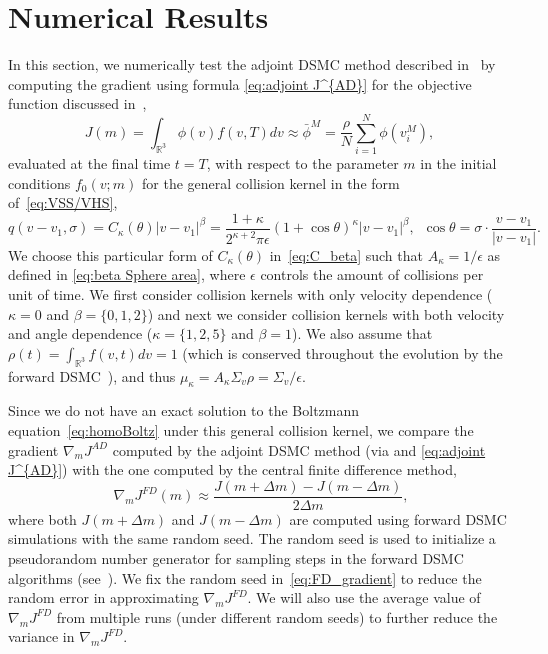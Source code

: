\documentclass[12pt,nopreprintline]{elsarticle}
\newcommand{\bbR}{\mathbb R} \newcommand{\bbS}{\mathbb S}
\begin{document}

\section{Numerical Results}\label{sec:numerics}

In this section, we numerically test the adjoint DSMC method described in~ by computing the gradient using formula \eqref{eq:adjoint J^{AD}} for the objective function discussed in~,
$$
J(m)= \int_{\bbR^3} \phi (v) f(v,T) dv  \approx \bar{\phi}^M = \frac{\rho}{N}\sum_{i=1}^N \phi(v_i^M),
$$
evaluated at the final time $t=T$, with respect to the parameter $m$ in the initial conditions $f_0(v;m)$ for the general collision kernel in the form of~\eqref{eq:VSS/VHS}, 
\begin{equation} \label{eq:C_beta}
q(v-v_1,\sigma) = C_\kappa(\theta) |v-v_1|^\beta =  \frac{1+\kappa}{2^{\kappa+2}\pi \epsilon}  (1+\cos{\theta})^\kappa |v-v_1|^\beta,  \, \,  \, \cos{\theta} = \sigma \cdot \frac{v-v_1}{|v-v_1|} .
\end{equation}
We choose this particular form of $C_\kappa(\theta)$ in~\eqref{eq:C_beta} such that $A_\kappa=1/\epsilon$ as defined in \eqref{eq:beta Sphere area}, where $\epsilon$ controls the amount of collisions per unit of time. 
We first consider collision kernels with only velocity dependence ($\kappa=0$ and $\beta=\{0,1,2\}$) and next we consider collision kernels with both velocity and angle dependence ($\kappa=\{1,2,5\}$ and $\beta=1$).
We also assume that  $\rho(t)=\int_{\bbR^3} f(v,t) dv=1$ (which is conserved throughout the evolution by the forward DSMC~), and thus $\mu_\kappa = A_\kappa \Sigma_v \rho = \Sigma_v/\epsilon$.


Since we do not have an exact solution to the Boltzmann equation~\eqref{eq:homoBoltz} under this general collision kernel, we compare the gradient  $\nabla_m J^{AD}$ computed by the adjoint DSMC method (via  and \cref{eq:adjoint J^{AD}}) with the one computed by the central finite difference method,
\begin{equation}~\label{eq:FD_gradient}
\nabla_m J^{FD}(m) \approx \frac{J(m+\Delta m)-J(m-\Delta m)}{2 \Delta m},
\end{equation}
where both $J(m+\Delta m)$ and $J(m-\Delta m)$ are computed using forward DSMC simulations with the same random seed. The random seed is used to initialize a pseudorandom number generator for sampling steps in the forward DSMC algorithms (see~). We fix the random seed in~\eqref{eq:FD_gradient} to reduce the random error in approximating $\nabla_m J^{FD}$. We will also use the average value of $\nabla_m J^{FD}$ from multiple runs (under different random seeds) to further reduce the variance in $\nabla_m J^{FD}$.
\end{document}
